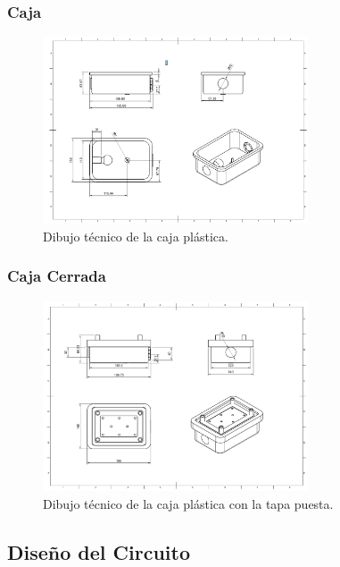 \documentclass[spanish, a4paper, 11pt]{article}
\begin{document}
\newpage
\subsubsection{Caja}

\begin{figure}[ht]
    \centering
    \includegraphics[width=0.7\textwidth]{./figures/Caja.png}
    \caption{Dibujo técnico de la caja plástica.}
\end{figure}
\FloatBarrier

\subsubsection{Caja Cerrada}

\begin{figure}[ht]
    \centering
    \includegraphics[width=0.7\textwidth]{./figures/Caja_completa.png}
    \caption{Dibujo técnico de la caja plástica con la tapa puesta.}
\end{figure}
\FloatBarrier

\subsection{Diseño del Circuito}
\end{document}

